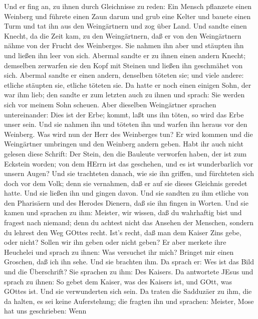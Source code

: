  Und er fing an, zu ihnen durch Gleichnisse zu reden: Ein
Mensch pflanzete einen Weinberg und führete einen Zaun darum und grub
eine Kelter und bauete einen Turm und tat ihn aus den Weingärtnern und
zog über Land.  Und sandte einen Knecht, da die Zeit kam, zu
den Weingärtnern, daß er von den Weingärtnern nähme von der Frucht des
Weinberges.  Sie nahmen ihn aber und stäupten ihn und ließen
ihn leer von sich.  Abermal sandte er zu ihnen einen andern
Knecht; demselben zerwarfen sie den Kopf mit Steinen und ließen ihn
geschmähet von sich.  Abermal sandte er einen andern,
denselben töteten sie; und viele andere: etliche stäupten sie, etliche
töteten sie.  Da hatte er noch einen einigen Sohn, der war
ihm lieb; den sandte er zum letzten auch zu ihnen und sprach: Sie werden
sich vor meinem Sohn scheuen.  Aber dieselben Weingärtner
sprachen untereinander: Dies ist der Erbe; kommt, laßt uns ihn töten, so
wird das Erbe unser sein.  Und sie nahmen ihn und töteten
ihn und warfen ihn heraus vor den Weinberg.  Was wird nun
der Herr des Weinberges tun? Er wird kommen und die Weingärtner
umbringen und den Weinberg andern geben.  Habt ihr auch
nicht gelesen diese Schrift: Der Stein, den die Bauleute verworfen
haben, der ist zum Eckstein worden;  von dem HErrn ist das
geschehen, und es ist wunderbarlich vor unsern Augen?  Und
sie trachteten danach, wie sie ihn griffen, und fürchteten sich doch vor
dem Volk; denn sie vernahmen, daß er auf sie dieses Gleichnis geredet
hatte. Und sie ließen ihn und gingen davon.  Und sie
sandten zu ihm etliche von den Pharisäern und des Herodes Dienern, daß
sie ihn fingen in Worten.  Und sie kamen und sprachen zu
ihm: Meister, wir wissen, daß du wahrhaftig bist und fragest nach
niemand; denn du achtest nicht das Ansehen der Menschen, sondern du
lehrest den Weg GOttes recht. Ist's recht, daß man dem Kaiser Zins gebe,
oder nicht? Sollen wir ihn geben oder nicht geben?  Er aber
merkete ihre Heuchelei und sprach zu ihnen: Was versuchet ihr mich?
Bringet mir einen Groschen, daß ich ihn sehe.  Und sie
brachten ihm. Da sprach er: Wes ist das Bild und die Überschrift? Sie
sprachen zu ihm: Des Kaisers.  Da antwortete JEsus und
sprach zu ihnen: So gebet dem Kaiser, was des Kaisers ist, und GOtt, was
GOttes ist. Und sie verwunderten sich sein.  Da traten die
Sadduzäer zu ihm, die da halten, es sei keine Auferstehung; die fragten
ihn und sprachen:  Meister, Mose hat uns geschrieben: Wenn
